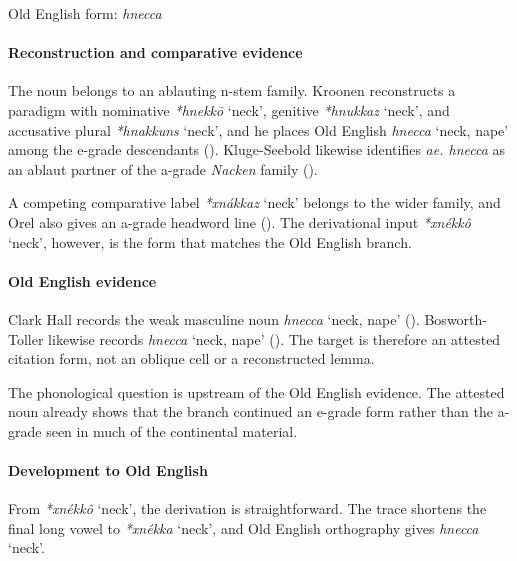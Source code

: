\documentclass[
  british,
  a4paper,
]{article}
\providecommand{\Recon}[1]{\emph{*#1}}
\begin{document}
Old English form: \emph{hnecca}

\paragraph{Reconstruction and comparative
evidence}\label{reconstruction-and-comparative-evidence-98}

The noun belongs to an ablauting n-stem family. Kroonen reconstructs a
paradigm with nominative \Recon{hnekkō} `neck', genitive \Recon{hnukkaz}
`neck', and accusative plural \Recon{hnakkuns} `neck', and he places Old
English {\emph{hnecca}} `neck, nape' among the e-grade descendants
(). Kluge-Seebold likewise
identifies \emph{ae. hnecca} as an ablaut partner of the a-grade
\emph{Nacken} family ().

A competing comparative label \Recon{xnákkaz} `neck' belongs to the
wider family, and Orel also gives an a-grade headword line
(). The derivational input
\Recon{xnékkô} `neck', however, is the form that matches the Old English
branch.

\paragraph{Old English evidence}\label{old-english-evidence-98}

Clark Hall records the weak masculine noun {\emph{hnecca}} `neck, nape'
(). Bosworth-Toller
likewise records {\emph{hnecca}} `neck, nape'
(). The
target is therefore an attested citation form, not an oblique cell or a
reconstructed lemma.

The phonological question is upstream of the Old English evidence. The
attested noun already shows that the branch continued an e-grade form
rather than the a-grade seen in much of the continental material.

\paragraph{Development to Old
English}\label{development-to-old-english-98}

From \Recon{xnékkô} `neck', the derivation is straightforward. The trace
shortens the final long vowel to \Recon{xnékka} `neck', and Old English
orthography gives {\emph{hnecca}} `neck'.
\end{document}
